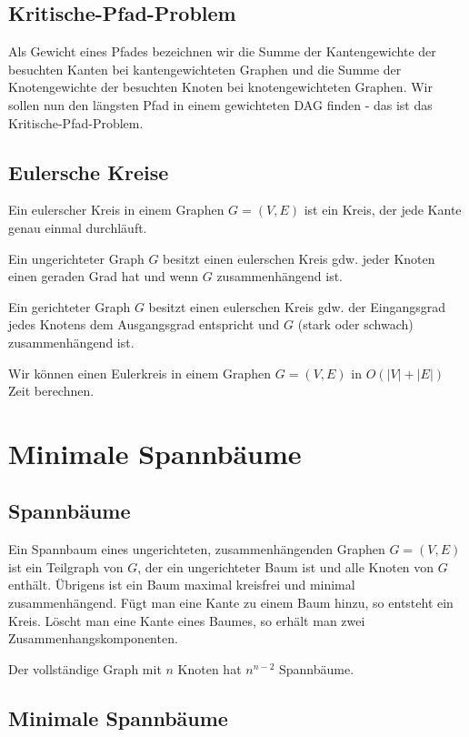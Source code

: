 \documentclass[12pt]{article}
\begin{document}
\subsection{Kritische-Pfad-Problem}

Als Gewicht eines Pfades bezeichnen wir die Summe der Kantengewichte der besuchten Kanten bei kantengewichteten Graphen und die Summe der Knotengewichte der besuchten Knoten bei knotengewichteten Graphen. Wir sollen nun den längsten Pfad in einem gewichteten DAG finden - das ist das Kritische-Pfad-Problem.

\subsection{Eulersche Kreise}

Ein eulerscher Kreis in einem Graphen $G = (V, E)$ ist ein Kreis, der jede Kante genau einmal durchläuft. 

Ein ungerichteter Graph $G$ besitzt einen eulerschen Kreis gdw. jeder Knoten einen geraden Grad hat und wenn $G$ zusammenhängend ist.

Ein gerichteter Graph $G$ besitzt einen eulerschen Kreis gdw. der Eingangsgrad jedes Knotens dem Ausgangsgrad entspricht und $G$ (stark oder schwach) zusammenhängend ist.

Wir können einen Eulerkreis in einem Graphen $G = (V, E)$ in $O(|V| + |E|)$ Zeit berechnen.

\section{Minimale Spannbäume}

\subsection{Spannbäume}

Ein Spannbaum eines ungerichteten, zusammenhängenden Graphen $G = (V, E)$ ist ein Teilgraph von $G$, der ein ungerichteter Baum ist und alle Knoten von $G$ enthält. Übrigens ist ein Baum maximal kreisfrei und minimal zusammenhängend. Fügt man eine Kante zu einem Baum hinzu, so entsteht ein Kreis. Löscht man eine Kante eines Baumes, so erhält man zwei Zusammenhangskomponenten.

Der vollständige Graph mit $n$ Knoten hat $n^{n-2}$ Spannbäume.

\subsection{Minimale Spannbäume}
\end{document}
